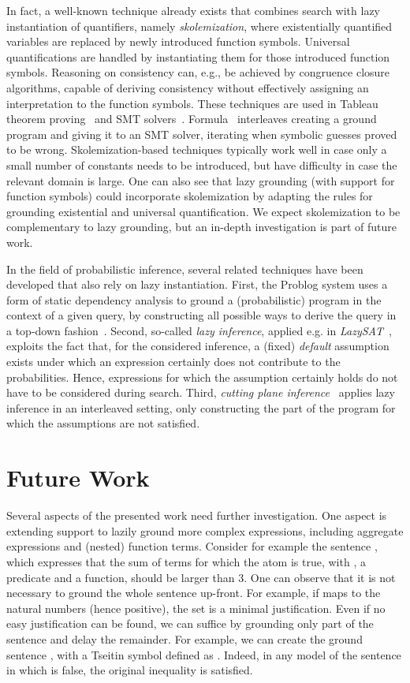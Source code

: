 \documentclass[11pt]{article}
\theoremstyle{plain}
\theoremstyle{definition}
\theoremstyle{example_basic}
\theoremstyle{example_contd}
\theoremstyle{plain}
\newcommand{\change}[1]{#1}
\begin{document}
In fact, a well-known technique already exists that combines search with lazy instantiation of quantifiers, namely \emph{skolemization}, where existentially quantified variables are replaced by newly introduced function symbols. Universal quantifications are handled by instantiating them for those introduced function symbols. Reasoning on consistency can, e.g., be achieved by congruence closure algorithms, capable of deriving consistency without effectively assigning an interpretation to the function symbols. These techniques are used in Tableau theorem proving~\cite{el/RV01/Hahnle01} and SMT solvers~\cite{DBLP:journals/jacm/DetlefsNS05}.
Formula~\cite{formula/JacksonB13} interleaves creating a ground program and giving it to an SMT solver, iterating when symbolic guesses proved to be wrong.
Skolemization-based techniques typically work well in case only a small number of constants needs to be introduced, but have difficulty in case the relevant domain is large.
One can also see that lazy grounding (with support for function symbols) could incorporate skolemization by adapting the rules for grounding existential and universal quantification.
We expect skolemization to be complementary to lazy grounding, but an in-depth investigation is part of future work.

In the field of probabilistic inference, several related techniques have been developed that also rely on lazy instantiation. First, the Problog system uses a form of static dependency analysis to ground a (probabilistic) program in the context of a given query, by constructing all possible ways to derive the query in a top-down fashion~. Second, so-called \emph{lazy inference}, applied e.g. in \emph{LazySAT}~\cite{aaai/SinglaD06}, exploits the fact that, for the considered inference, a (fixed) \emph{default} assumption exists under which an expression certainly does not contribute to the probabilities. Hence, expressions for which the assumption certainly holds do not have to be considered during search. Third, \emph{cutting plane inference}~\cite{riedel09cutting} applies lazy inference in an interleaved setting, only constructing the part of the program for which the assumptions are not satisfied.


\section{Future Work}
\change{Several aspects of the presented work need further
  investigation.}
One aspect is extending support to lazily ground more complex expressions, including aggregate expressions and (nested) function terms. Consider for example the sentence , which expresses that the sum of terms  for which the atom  is true, with ,  a predicate and  a function, should be larger than 3. One can observe that it is not necessary to ground the whole sentence up-front. For example, if  maps to the natural numbers (hence positive), the set  is a minimal justification. Even if no easy justification can be found, we can suffice by grounding only part of the sentence and delay the remainder. For example, we can create the ground sentence , with  a Tseitin symbol defined as . Indeed, in any model of the sentence in which  is false, the original inequality is satisfied.
\end{document}
